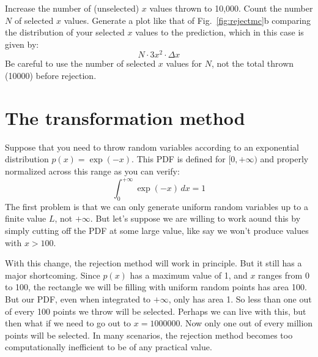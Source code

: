 \begin{samepage}
\begin{plot} \end{plot}
Increase the number of (unselected) $x$ values thrown to 10,000.
Count the number $N$ of selected $x$ values.  Generate a plot like that of
Fig.~\ref{fig:rejectmc}b comparing the distribution of your selected
$x$ values to the prediction, which in this case is given by:
\begin{displaymath}
N \cdot 3x^2 \cdot \Delta x
\end{displaymath}
Be careful to use the number of selected $x$ values for $N$, not the total thrown (10000) before rejection.
\end{samepage}

\section{The transformation method}

Suppose that you need to throw random variables according to an
exponential distribution $p(x) = \exp(-x)$.  This PDF is defined for
$[0,+\infty)$ and properly normalized across this range as you can verify:
\begin{displaymath}
  \int_0^{+\infty} \exp(-x) \, dx = 1
\end{displaymath}    
The first problem is that we can only generate uniform random
variables up to a finite value $L$, not $+\infty$.  But let's suppose we are
willing to work aound this by simply cutting off the PDF at some large
value, like say we won't produce values with $x>100$.

With this change, the rejection method will work in principle.  But it
still has a major shortcoming.  Since $p(x)$ has a maximum value of 1,
and $x$ ranges from 0 to 100, the rectangle we will be filling with
uniform random points has area 100.  But our PDF, even when
integrated to $+\infty$, only has area 1.  So less than one out of
every 100 points we throw will be selected.  Perhaps we can live with
this, but then what if we need to go out to $x=1000000$.  Now only one
out of every million points will be selected.  In many scenarios, the
rejection method becomes too computationally inefficient to be of any
practical value.

